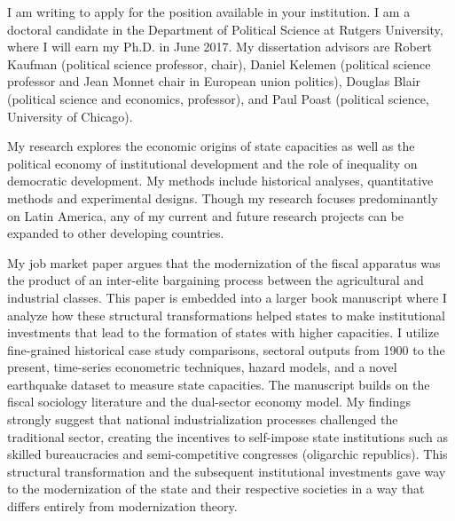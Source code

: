 \documentclass[10pt,stdletter,dateno,sigleft]{newlfm} %
\begin{document}
\begin{newlfm}


I am writing to apply for the position available in your institution. I am a doctoral candidate in the Department of Political Science at Rutgers University, where I will earn my Ph.D. in June 2017. My dissertation advisors are Robert Kaufman (political science professor, chair), Daniel Kelemen (political science professor and Jean Monnet chair in European union politics), Douglas Blair (political science and economics, professor), and Paul Poast (political science, University of Chicago).

My research explores the economic origins of state capacities as well as the political economy of institutional development and the role of inequality on democratic development. My methods include historical analyses, quantitative methods and experimental designs. Though my research focuses predominantly on Latin America, any of my current and future research projects can be expanded to other developing countries.


My job market paper argues that the modernization of the fiscal apparatus was the product of an inter-elite bargaining process between the agricultural and industrial classes. This paper is embedded into a larger book manuscript where I analyze how these structural transformations helped states to make institutional investments that lead to the formation of states with higher capacities. I utilize fine-grained historical case study comparisons, sectoral outputs from 1900 to the present, time-series econometric techniques, hazard models, and a novel earthquake dataset to measure state capacities. The manuscript builds on the fiscal sociology literature and the dual-sector economy model. My findings strongly suggest that national industrialization processes challenged the traditional sector, creating the incentives to self-impose state institutions such as skilled bureaucracies and semi-competitive congresses (oligarchic republics). This structural transformation and the subsequent institutional investments gave way to the modernization of the state and their respective societies in a way that differs entirely from modernization theory.



\end{newlfm}
\end{document}
